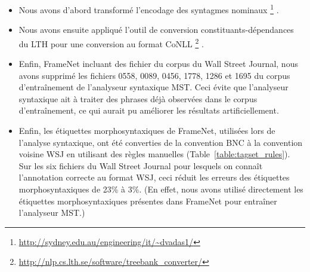\begin{itemize}
    \item Nous avons d'abord transformé l'encodage des syntagmes nominaux
        \footnote{\url{http://sydney.edu.au/engineering/it/~dvadas1/}}
        \citep{vadas2007adding}.
    \item Nous avons ensuite appliqué l'outil de conversion
        constituants-dépendances du LTH pour une conversion au format CoNLL
        \footnote{\url{http://nlp.cs.lth.se/software/treebank_converter/}}
        \citep{johansson2007extended}.
    \item Enfin, FrameNet incluant des fichier du corpus du Wall Street
        Journal, nous avons supprimé les fichiers 0558, 0089, 0456, 1778, 1286
        et 1695 du corpus d'entraînement de l'analyseur syntaxique MST. Ceci
        évite que l'analyseur syntaxique ait à traiter des phrases déjà
        observées dans le corpus d'entraînement, ce qui aurait pu améliorer les
        résultats artificiellement.
    \item Enfin, les étiquettes morphosyntaxiques de FrameNet, utilisées lors
        de l'analyse syntaxique, ont été converties de la convention BNC à la
        convention voisine WSJ en utilisant des règles manuelles
        (Table~\ref{table:tagset_rules}). Sur les six fichiers du Wall Street
        Journal pour lesquels on connaît l'annotation correcte au format WSJ,
        ceci réduit les erreurs des étiquettes morphosyntaxiques de 23\% à 3\%.
        (En effet, nous avons utilisé directement les étiquettes
        morphosyntaxiques présentes dans FrameNet pour entraîner l'analyseur
        MST.)
\end{itemize}


